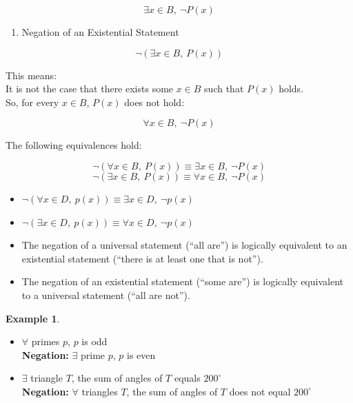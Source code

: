 \documentclass[
]{book}
\providecommand{\tightlist}{%
  \setlength{\itemsep}{0pt}\setlength{\parskip}{0pt}}
\theoremstyle{definition}
\theoremstyle{definition}
\newtheorem{example}{Example}[chapter]
\theoremstyle{definition}
\theoremstyle{definition}
\theoremstyle{remark}
\begin{document}
\[
\exists x \in B,\ \neg P(x)
\]

\begin{enumerate}
\def\labelenumi{\arabic{enumi}.}
\setcounter{enumi}{1}
\tightlist
\item
  Negation of an Existential Statement
\end{enumerate}

\[
\neg (\exists x \in B,\ P(x))
\]

This means:\\
It is not the case that there exists some \(x \in B\) such that \(P(x)\) holds.\\
So, for every \(x \in B\), \(P(x)\) does not hold:

\[
\forall x \in B,\ \neg P(x)
\]

The following equivalences hold:

\[ \neg (\forall x \in B,\ P(x)) \equiv \exists x \in B,\ \neg P(x) \]
\[ \neg (\exists x \in B,\ P(x)) \equiv \forall x \in B,\ \neg P(x) \]

\begin{itemize}
\item
  \(\neg (\forall x \in D,\ p(x)) \equiv \exists x \in D,\ \neg p(x)\)
\item
  \(\neg (\exists x \in D,\ p(x)) \equiv \forall x \in D,\ \neg p(x)\)
\item
  The negation of a universal statement (``all are'') is logically equivalent to an existential statement (``there is at least one that is not'').
\item
  The negation of an existential statement (``some are'') is logically equivalent to a universal statement (``all are not'').
\end{itemize}

\begin{example}
\protect\hypertarget{exm:unnamed-chunk-52}{}\label{exm:unnamed-chunk-52}\leavevmode

\begin{itemize}
\item
  \(\forall\) primes \(p\), \(p\) is odd\\
  \textbf{Negation:} \(\exists\) prime \(p\), \(p\) is even
\item
  \(\exists\) triangle \(T\), the sum of angles of \(T\) equals \(200^\circ\)\\
  \textbf{Negation:} \(\forall\) triangles \(T\), the sum of angles of \(T\) does not equal \(200^\circ\)
\end{itemize}

\end{example}
\end{document}
